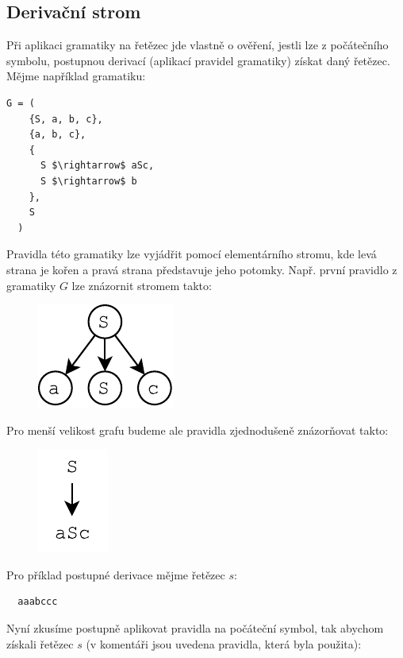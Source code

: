 \subsection{Derivační strom}
Při aplikaci gramatiky na řetězec jde vlastně o ověření,
jestli lze z počátečního symbolu,
postupnou derivací (aplikací pravidel gramatiky) získat daný řetězec.
Mějme například gramatiku:

\begin{lstlisting}[mathescape]
  G = (
    {S, a, b, c},
    {a, b, c},
    {
      S $\rightarrow$ aSc,
      S $\rightarrow$ b
    },
    S
  )
\end{lstlisting}
\noindent
Pravidla této gramatiky lze vyjádřit pomocí elementárního stromu,
kde levá strana je kořen a pravá strana představuje jeho potomky.
Např. první pravidlo z gramatiky $G$ lze znázornit stromem takto:
\begin{figure}[H]
  \centering
  \includegraphics{fig/RuleTree1.pdf}
\end{figure}

\noindent
Pro menší velikost grafu budeme ale pravidla zjednodušeně znázorňovat takto:

\begin{figure}[H]
  \centering
  \includegraphics{fig/RuleTree2.pdf}
\end{figure}

\noindent
Pro příklad postupné derivace mějme řetězec $s$:

\begin{lstlisting}
  aaabccc
\end{lstlisting}

\noindent
Nyní zkusíme postupně aplikovat pravidla na počáteční symbol,
tak abychom získali řetězec $s$
(v komentáři jsou uvedena pravidla, která byla použita):

